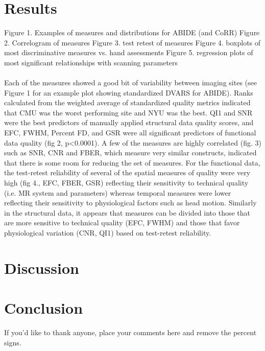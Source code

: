 \section{Results}
\label{sec:25}
Figure 1. Examples of measures and distributions for ABIDE (and CoRR)
Figure 2. Correlogram of measures
Figure 3. test retest of measures
Figure 4. boxplots of most discriminative measures vs. hand assessments
Figure 5. regression plots of most significant relationships with scanning parameters
\\\\
Each of the measures showed a good bit of variability between imaging sites (see Figure 1 for an example plot showing standardized DVARS for ABIDE). Ranks calculated from the weighted average of standardized quality metrics indicated that CMU was the worst performing site and NYU was the best. QI1 and SNR were the best predictors of manually applied structural data quality scores, and EFC, FWHM, Percent FD, and GSR were all significant predictors of functional data quality (fig 2, p<0.0001). A few of the measures are highly correlated (fig. 3) such as SNR, CNR and FBER, which measure very similar constructs, indicated that there is some room for reducing the set of measures. For the functional data, the test­-retest reliability of several of the spatial measures of quality were very high (fig 4., EFC, FBER, GSR) reflecting their sensitivity to technical quality (i.e. MR system and parameters) whereas temporal measures were lower reflecting their sensitivity to physiological factors such as head motion. Similarly in the structural data, it appears that measures can be divided into those that are more sensitive to technical quality (EFC, FWHM) and those that favor physiological variation (CNR, QI1) based on test­-retest reliability.

\nocite{*}

\section{Discussion}
\label{sec:26}
\section{Conclusion}
\label{sec:27}
\begin{acknowledgements}
If you'd like to thank anyone, place your comments here
and remove the percent signs.
\end{acknowledgements}




